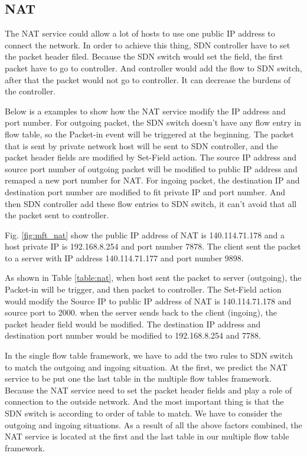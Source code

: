 \documentclass[journal]{IEEEtran}
\begin{document}
\subsection{NAT}
The NAT service could allow a lot of hosts to use one public IP address to connect the network.
In order to achieve this thing, SDN controller have to set the packet header filed.  Because the SDN switch would set the field, the first packet have to go to controller. And controller would add the flow to SDN switch, after that the packet would not go to controller. It can decrease the burdens of the controller.

Below is a examples to show how the NAT service modify the IP address and port number. For outgoing packet, the SDN switch doesn’t have any flow entry in flow table, so the Packet-in event will be triggered at the beginning. The packet that is sent by private network host will be sent to SDN controller, and the packet header fields are modified by Set-Field action. The source IP address and source port number of outgoing packet will be modified to public IP address and remaped a new port number for NAT. For ingoing packet, the destination IP and destination port number are modified to fit private IP and port number. And then SDN controller add these flow entries to SDN switch, it can’t avoid that all the packet sent to controller.

Fig. \ref{fig:mft_nat} show the public IP address of NAT is 140.114.71.178 and a host private IP is 192.168.8.254 and port number 7878. The client sent the packet to a server with IP address 140.114.71.177 and port number 9898.

As shown in Table \ref{table:nat}, when host sent the packet to server (outgoing), the Packet-in will be trigger, and then packet to controller. The Set-Field action would modify the Source IP to public IP address of NAT is 140.114.71.178 and source port to 2000. when the server sends back to the client (ingoing), the packet header field would be modified. The destination IP address and destination port number would be modified to 192.168.8.254 and 7788.

In the single flow table framework, we have to add the two rules to SDN switch to match the outgoing and ingoing situation. At the first, we predict the NAT service to be put one the last table in the multiple flow tables framework.  Because the NAT service need to set the packet header fields and play a role of connection to the outside network. And the most important thing is that the SDN switch is according to order of table to match. We have to consider the outgoing and ingoing situations. As a result of all the above factors combined, the NAT service is located at the first and the last table in our multiple flow table framework.
\end{document}
